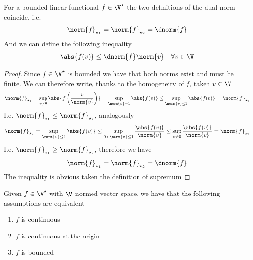 \documentclass[../mmf.tex]{subfiles}
\begin{document}
\begin{thm}
	For a bounded linear functional $f\in\V^\star$ the two definitions of the dual norm coincide, i.e.
	\begin{equation*}
		\norm{f}_{\star_1}=\norm{f}_{\star_2}=\dnorm{f}
	\end{equation*}
	And we can define the following inequality
	\begin{equation}
		\abs{f(v)}\le\dnorm{f}\norm{v}\quad\forall v\in\V
		\label{eq:ineqdnorm}
	\end{equation}
\end{thm}
\begin{proof}
	Since $f\in\V^\star$ is bounded we have that both norms exist and must be finite. We can therefore write, thanks to the homogeneity of $f$, taken $v\in\V$
	\begin{equation*}
		\norm{f}_{\star_1}=\sup_{v\ne0}\abs{f\left( \frac{v}{\norm{v}} \right)}=\sup_{\norm{v}=1}\abs{f(v)}\le\sup_{\norm{v}\le1}\abs{f(v)}=\norm{f}_{\star_2}
	\end{equation*}
	I.e. $\norm{f}_{\star_1}\le\norm{f}_{\star_2}$, analogously
	\begin{equation*}
		\norm{f}_{\star_2}=\sup_{\norm{v}\le1}\abs{f(v)}\le\sup_{0<\norm{v}\le1}\frac{\abs{f(v)}}{\norm{v}}\le\sup_{v\ne0}\frac{\abs{f(v)}}{\norm{v}}=\norm{f}_{\star_2}
	\end{equation*}
	I.e. $\norm{f}_{\star_1}\ge\norm{f}_{\star_2}$, therefore we have
	\begin{equation*}
		\norm{f}_{\star_1}=\norm{f}_{\star_2}=\dnorm{f}
	\end{equation*}
	The inequality is obvious taken the definition of supremum
\end{proof}
\begin{thm}
	Given $f\in\V^\star$ with $\V$ normed vector space, we have that the following assumptions are equivalent
	\begin{enumerate}
	\item $f$ is continuous
	\item $f$ is continuous at the origin
	\item $f$ is bounded
	\end{enumerate}
\end{thm}
\end{document}
